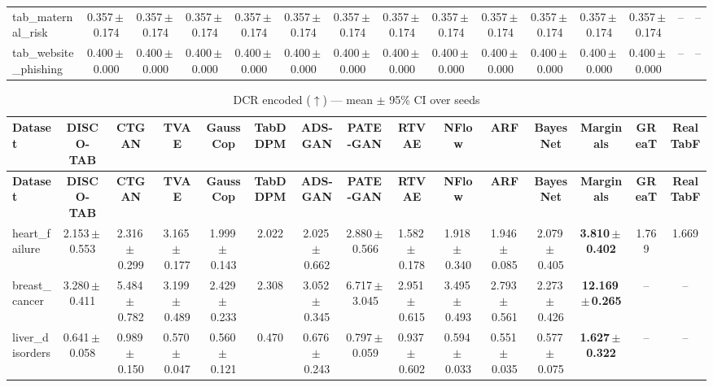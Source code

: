\documentclass[8pt]{extarticle}
\begin{document}
\begin{longtable}{l*{14}{c}}
tab\_maternal\_risk & 0.357\,$\pm$\,0.174 & 0.357\,$\pm$\,0.174 & 0.357\,$\pm$\,0.174 & 0.357\,$\pm$\,0.174 & 0.357\,$\pm$\,0.174 & 0.357\,$\pm$\,0.174 & 0.357\,$\pm$\,0.174 & 0.357\,$\pm$\,0.174 & 0.357\,$\pm$\,0.174 & 0.357\,$\pm$\,0.174 & 0.357\,$\pm$\,0.174 & 0.357\,$\pm$\,0.174 & -- & -- \\
tab\_website\_phishing & 0.400\,$\pm$\,0.000 & 0.400\,$\pm$\,0.000 & 0.400\,$\pm$\,0.000 & 0.400\,$\pm$\,0.000 & 0.400\,$\pm$\,0.000 & 0.400\,$\pm$\,0.000 & 0.400\,$\pm$\,0.000 & 0.400\,$\pm$\,0.000 & 0.400\,$\pm$\,0.000 & 0.400\,$\pm$\,0.000 & 0.400\,$\pm$\,0.000 & 0.400\,$\pm$\,0.000 & -- & -- \\
\end{longtable}
\begin{longtable}{l*{14}{c}}
\caption{DCR encoded ($\uparrow$) --- mean $\pm$ 95\% CI over seeds}\\
\toprule
\textbf{Dataset} & \textbf{DISCO-TAB} & \textbf{CTGAN} & \textbf{TVAE} & \textbf{GaussCop} & \textbf{TabDDPM} & \textbf{ADS-GAN} & \textbf{PATE-GAN} & \textbf{RTVAE} & \textbf{NFlow} & \textbf{ARF} & \textbf{BayesNet} & \textbf{Marginals} & \textbf{GReaT} & \textbf{RealTabF} \\
\midrule
\endfirsthead
\toprule
\textbf{Dataset} & \textbf{DISCO-TAB} & \textbf{CTGAN} & \textbf{TVAE} & \textbf{GaussCop} & \textbf{TabDDPM} & \textbf{ADS-GAN} & \textbf{PATE-GAN} & \textbf{RTVAE} & \textbf{NFlow} & \textbf{ARF} & \textbf{BayesNet} & \textbf{Marginals} & \textbf{GReaT} & \textbf{RealTabF} \\
\midrule
\endhead
\bottomrule
\endfoot
heart\_failure & 2.153\,$\pm$\,0.553 & 2.316\,$\pm$\,0.299 & 3.165\,$\pm$\,0.177 & 1.999\,$\pm$\,0.143 & 2.022 & 2.025\,$\pm$\,0.662 & 2.880\,$\pm$\,0.566 & 1.582\,$\pm$\,0.178 & 1.918\,$\pm$\,0.340 & 1.946\,$\pm$\,0.085 & 2.079\,$\pm$\,0.405 & \textbf{3.810\,$\pm$\,0.402} & 1.769 & 1.669 \\
breast\_cancer & 3.280\,$\pm$\,0.411 & 5.484\,$\pm$\,0.782 & 3.199\,$\pm$\,0.489 & 2.429\,$\pm$\,0.233 & 2.308 & 3.052\,$\pm$\,0.345 & 6.717\,$\pm$\,3.045 & 2.951\,$\pm$\,0.615 & 3.495\,$\pm$\,0.493 & 2.793\,$\pm$\,0.561 & 2.273\,$\pm$\,0.426 & \textbf{12.169\,$\pm$\,0.265} & -- & -- \\
liver\_disorders & 0.641\,$\pm$\,0.058 & 0.989\,$\pm$\,0.150 & 0.570\,$\pm$\,0.047 & 0.560\,$\pm$\,0.121 & 0.470 & 0.676\,$\pm$\,0.243 & 0.797\,$\pm$\,0.059 & 0.937\,$\pm$\,0.602 & 0.594\,$\pm$\,0.033 & 0.551\,$\pm$\,0.035 & 0.577\,$\pm$\,0.075 & \textbf{1.627\,$\pm$\,0.322} & -- & -- \\

\end{longtable}
\end{document}
